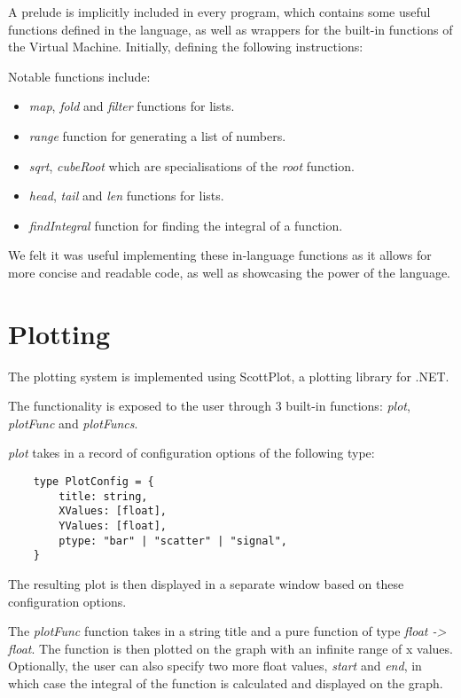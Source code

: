 A prelude is implicitly included in every program, which contains some useful functions defined in the language, as 
well as wrappers for the built-in functions of the Virtual Machine. Initially, defining the following instructions:

Notable functions include:

\begin{itemize}
    \item \textit{map}, \textit{fold} and \textit{filter} functions for lists.
    \item \textit{range} function for generating a list of numbers.
    \item \textit{sqrt}, \textit{cubeRoot} which are specialisations of the \textit{root} function.
    \item \textit{head}, \textit{tail} and \textit{len} functions for lists.
    \item \textit{findIntegral} function for finding the integral of a function.
\end{itemize}

We felt it was useful implementing these in-language functions as it allows for more concise and readable code, as
well as showcasing the power of the language.

\section{Plotting}\label{sec:plotting}

The plotting system is implemented using ScottPlot\citep{scottPlot}, a plotting library for .NET\@.

The functionality is exposed to the user through 3 built-in functions: \textit{plot}, \textit{plotFunc} and 
\textit{plotFuncs}.

\textit{plot} takes in a record of configuration options of the following type:

\begin{verbatim}
    type PlotConfig = {
        title: string,
        XValues: [float],
        YValues: [float],
        ptype: "bar" | "scatter" | "signal",
    }
\end{verbatim}

The resulting plot is then displayed in a separate window based on these configuration options.


The \textit{plotFunc} function takes in a string title and a pure function of type \textit{float -> float}.
The function is then plotted on the graph with an infinite range of x values.
Optionally, the user can also specify two more float values, \textit{start} and \textit{end}, in which case the 
integral of the function is calculated and displayed on the graph.

